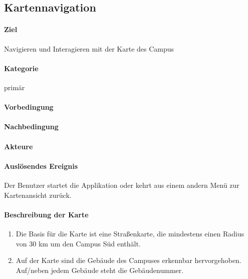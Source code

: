 \subsection{Kartennavigation}
\label{Kartennavigation}
\paragraph{Ziel}
Navigieren und Interagieren mit der Karte des Campus
\paragraph{Kategorie}
primär
\paragraph{Vorbedingung}

\paragraph{Nachbedingung}

\paragraph{Akteure}

\paragraph{Auslösendes Ereignis}
Der Benutzer startet die Applikation oder kehrt aus einem andern Menü zur Kartenansicht zurück.
\paragraph{Beschreibung der Karte}
\begin{enumerate}
    \item Die Basis für die Karte ist eine Straßenkarte, die mindestens einen Radius von 30 km um den Campus Süd enthält.
    \item Auf der Karte sind die Gebäude des Campuses erkennbar hervorgehoben. Auf/neben jedem Gebäude steht die Gebäudenummer.
\end{enumerate}

